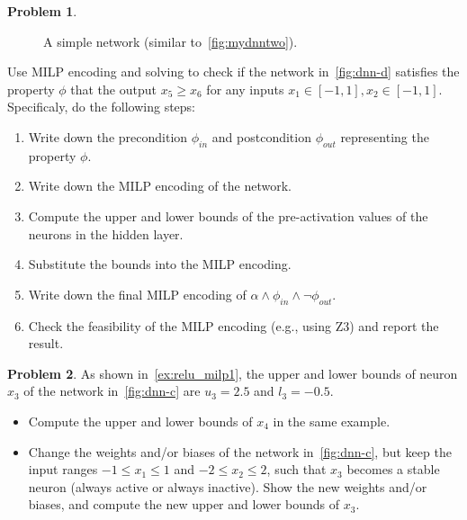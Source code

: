 \documentclass[oneside,11pt,dvipsnames]{book}
\numberwithin{equation}{section}
\theoremstyle{definition}
\newtheorem{problem}{Problem}[section]
\theoremstyle{remark}
\newcommand{\tvn}[1]{\iftoggle{usecomment}{{\color{red}{[TVN]: #1}}}{}}
\newcommand{\hd}[1]{\iftoggle{usecomment}{{\color{blue}{[HD]: #1}}}{}}
\begin{document}
\begin{problem}\label{prob:milp-dnn}
\begin{figure}
\centering
{}
\caption{\label{fig:dnn-d}A simple network (similar to~\autoref{fig:mydnntwo}).}
\end{figure}

Use MILP encoding and solving to check if the network in~\autoref{fig:dnn-d} satisfies the property $\phi$ that the output $x_5 \ge x_6$ for any inputs $x_1 \in [-1,1], x_2\in[-1,1]$. Specificaly, do the following steps:
\begin{enumerate}
    \item Write down the precondition $\phi_{in}$ and postcondition $\phi_{out}$ representing the property $\phi$.
    \item Write down the MILP encoding of the network.
    \item Compute the upper and lower bounds of the pre-activation values of the neurons in the hidden layer.
    \item Substitute the bounds into the MILP encoding.
    \item Write down the final MILP encoding of $\alpha \land \phi_{in} \land \neg{\phi_{out}}$.
    \item Check the feasibility of the MILP encoding (e.g., using Z3) and report the result.
\end{enumerate}
\end{problem}

\begin{problem}\label{prob:stable-neuron}
As shown in~\autoref{ex:relu_milp1}, the upper and lower bounds of neuron $x_3$ of the network in~\autoref{fig:dnn-c} are $u_3 = 2.5$ and $l_3 = -0.5$.
\begin{itemize}
\item Compute the upper and lower bounds of $x_4$ in the same example.
\item Change the weights and/or biases of the network in~\autoref{fig:dnn-c}, but keep the input ranges $-1 \le x_1 \le 1$ and $-2 \le x_2 \le 2$, such that $x_3$ becomes a stable neuron (always active or always inactive).  Show the new weights and/or biases, and compute the new upper and lower bounds of $x_3$.
\end{itemize}
\end{problem}

\end{document}
